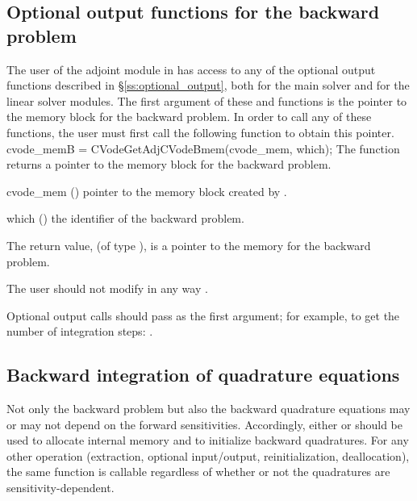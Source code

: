 \subsection{Optional output functions for the backward problem}\label{ss:optional_output_b}
The user of the adjoint module in {\cvodes} has access to any of the optional
output functions described in \S\ref{ss:optional_output}, both for the main solver
and for the linear solver modules. The first argument of these  and
 functions is the pointer to the {\cvodes} memory block for the
backward problem. In order to call any of these functions, the user must first 
call the following function to obtain this pointer.
{
  cvode\_memB = CVodeGetAdjCVodeBmem(cvode\_mem, which);
}
{
  The function  returns a pointer to the {\cvodes}
  memory block for the backward problem.
}
{
  \begin{args}
  \item[cvode\_mem] ()
    pointer to the {\cvodes} memory block created by .
  \item[which] ()
    the identifier of the backward problem.
  \end{args}
}
{
  The return value,  (of type ), is a pointer to the
  {\cvodes} memory for the backward problem.
}
{
  {\warn}The user should not modify in any way .

  Optional output calls should pass  as the first argument;
  for example, to get the number of integration steps:
  .
}


\subsection{Backward integration of quadrature equations}

Not only the backward problem but also the backward quadrature equations 
may or may not depend on the forward sensitivities.  Accordingly, either 
 or  should be used to allocate internal 
memory and to initialize backward quadratures.  For any other operation 
(extraction, optional input/output, reinitialization, deallocation),
the same function is callable regardless of whether or not the quadratures
are sensitivity-dependent.

